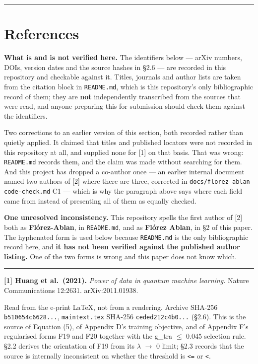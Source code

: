 \documentclass[
  10pt,
]{article}
\newcounter{none} %
\begin{document}
\begin{center}\rule{0.5\linewidth}{0.5pt}\end{center}

\section{References}\label{references}

\textbf{What is and is not verified here.} The identifiers below ---
arXiv numbers, DOIs, version dates and the source hashes in \S{}2.6 ---
are recorded in this repository and checkable against it. Titles,
journals and author lists are taken from the citation block in
\texttt{README.md}, which is this repository's only bibliographic record
of them; they are \textbf{not} independently transcribed from the
sources that were read, and anyone preparing this for submission should
check them against the identifiers.

Two corrections to an earlier version of this section, both recorded
rather than quietly applied. It claimed that titles and published
locators were not recorded in this repository at all, and supplied none
for {[}1{]} on that basis. That was wrong: \texttt{README.md} records
them, and the claim was made without searching for them. And this
project has dropped a co-author once --- an earlier internal document
named two authors of {[}2{]} where there are three, corrected in
\texttt{docs/\allowbreak{}florez-ablan-code-check.md} C1 --- which is why the
paragraph above says where each field came from instead of presenting
all of them as equally checked.

\textbf{One unresolved inconsistency.} This repository spells the first
author of {[}2{]} both as \textbf{Flórez-Ablan}, in \texttt{README.md},
and as \textbf{Flórez Ablan}, in \S{}2 of this paper. The hyphenated
form is used below because \texttt{README.md} is the only bibliographic
record here, and \textbf{it has not been verified against the published
author listing.} One of the two forms is wrong and this paper does not
know which.

\begin{center}\rule{0.5\linewidth}{0.5pt}\end{center}

\textbf{{[}1{]} Huang et al.~(2021).} \emph{Power of data in quantum
machine learning.} Nature Communications 12:2631. arXiv:2011.01938.

Read from the e-print LaTeX, not from a rendering. Archive SHA-256
\texttt{b510654c6628...}, \texttt{maintext.tex} SHA-256
\texttt{ceded212c4b0...} (\S{}2.6). This is the source of Equation (5),
of Appendix D's training objective, and of Appendix F's regularised
forms F19 and F20 together with the g\_tra \(\le\) 0.045 selection rule.
\S{}2.2 derives the orientation of F19 from its \(\lambda\) \(\to\) 0
limit; \S{}2.3 records that the source is internally inconsistent on
whether the threshold is \texttt{\textless{}=} or \texttt{\textless{}}.
\end{document}
